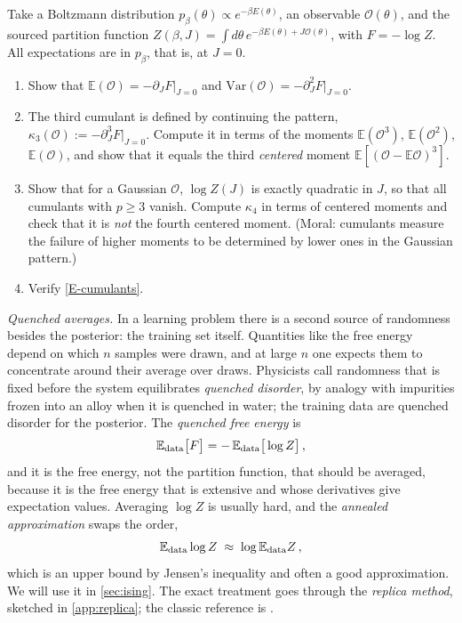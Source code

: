 \documentclass[11pt]{article}
\newcommand{\E}{\mathbb{E}}
\newcommand{\CO}{{\mathcal O}}
\newcommand{\pd}{\partial}
\begin{document}
\begin{exercise}
\label{ex:cumulants}
\important
Take a Boltzmann distribution $p_\beta(\theta)\propto e^{-\beta E(\theta)}$, an observable $\CO(\theta)$, and the sourced partition function $Z(\beta,J) = \int d\theta\, e^{-\beta E(\theta)+J\CO(\theta)}$, with $F = -\log Z$. All expectations are in $p_\beta$, that is, at $J=0$.
\begin{enumerate}
  \item Show that $\E(\CO) = -\pd_JF|_{J=0}$ and $\mathrm{Var}(\CO) = -\pd_J^2F|_{J=0}$.
  \item The third cumulant is defined by continuing the pattern, $\kappa_3(\CO) := -\pd_J^3F|_{J=0}$. Compute it in terms of the moments $\E(\CO^3)$, $\E(\CO^2)$, $\E(\CO)$, and show that it equals the third \emph{centered} moment $\E[(\CO-\E\CO)^3]$.
  \item Show that for a Gaussian $\CO$, $\log Z(J)$ is exactly quadratic in $J$, so that all cumulants with $p\geq 3$ vanish. Compute $\kappa_4$ in terms of centered moments and check that it is \emph{not} the fourth centered moment. (Moral: cumulants measure the failure of higher moments to be determined by lower ones in the Gaussian pattern.)
  \item Verify \eqref{E-cumulants}.
\end{enumerate}
\end{exercise}

\emph{Quenched averages.} In a learning problem there is a second source of randomness besides the posterior: the training set itself. Quantities like the free energy depend on which $n$ samples were drawn, and at large $n$ one expects them to concentrate around their average over draws. Physicists call randomness that is fixed before the system equilibrates \emph{quenched disorder}, by analogy with impurities frozen into an alloy when it is quenched in water; the training data are quenched disorder for the posterior. The \emph{quenched free energy} is
%
\begin{equation}
    \E_{\rm data}\big[F\big] = -\,\E_{\rm data}\big[\log Z\big]\,, \label{quenched-F}
\end{equation}
%
and it is the free energy, not the partition function, that should be averaged, because it is the free energy that is extensive and whose derivatives give expectation values. Averaging $\log Z$ is usually hard, and the \emph{annealed approximation} swaps the order,
%
\begin{equation}
    \E_{\rm data}\log Z \;\approx\; \log\E_{\rm data}Z\,, \label{annealed-swap}
\end{equation}
%
which is an upper bound by Jensen's inequality and often a good approximation. We will use it in \cref{sec:ising}. The exact treatment goes through the \emph{replica method}, sketched in \cref{app:replica}; the classic reference is \cite{engel2001statistical}.
\end{document}
